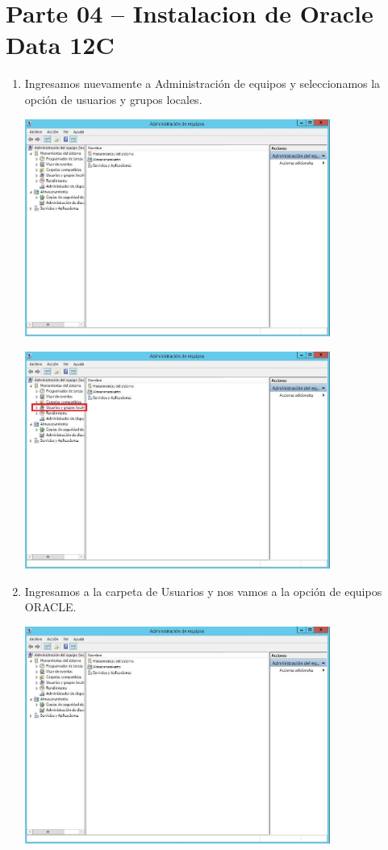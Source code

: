 \section{Parte 04 – Instalacion de Oracle Data 12C} 
\begin{enumerate}[1.]
	      
	\item Ingresamos nuevamente a Administraci\'on de equipos y seleccionamos  la opci\'on de usuarios y grupos locales.\\
	\begin{center}
	\includegraphics[width=10cm]{./Imagenes/jhordy1} 
	\end{center}
	\hfill \break	
	\hfill \break
	\hfill \break
	\hfill \break
	\begin{center}
	\includegraphics[width=10cm]{./Imagenes/jhordy11} 
	\end{center}
	\hfill \break
	\hfill \break
	\hfill \break
	\hfill \break
	\item Ingresamos a la carpeta de Usuarios y nos vamos a la opci\'on de equipos ORACLE.\\
	\begin{center}
	\includegraphics[width=10cm]{./Imagenes/jhordy2} 

\end{center}
\end{enumerate}
